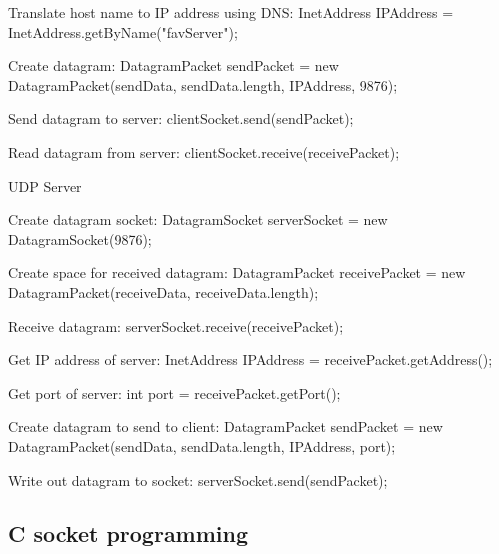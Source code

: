 		\item Translate host name to IP address using DNS: InetAddress IPAddress = InetAddress.getByName("favServer");
		\item Create datagram: DatagramPacket sendPacket = new DatagramPacket(sendData, sendData.length, IPAddress, 9876);
		\item Send datagram to server: clientSocket.send(sendPacket);
		\item Read datagram from server: clientSocket.receive(receivePacket);
	\enumend
	\item UDP Server
	\enumstart
		\item Create datagram socket: DatagramSocket serverSocket = new DatagramSocket(9876);
		\item Create space for received datagram: DatagramPacket receivePacket = new DatagramPacket(receiveData, receiveData.length);
		\item Receive datagram: serverSocket.receive(receivePacket);
		\item Get IP address of server: InetAddress IPAddress = receivePacket.getAddress();
		\item Get port of server: int port = receivePacket.getPort();
		\item Create datagram to send to client: DatagramPacket sendPacket = new DatagramPacket(sendData, sendData.length, IPAddress, port);
		\item Write out datagram to socket: serverSocket.send(sendPacket);
	\enumend
\enumend

\subsection{C socket programming}
\enumstart


